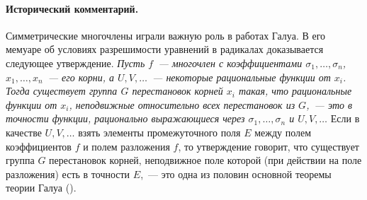 \paragraph{Исторический комментарий.} Симметрические многочлены играли важную роль в работах Галуа. В его
мемуаре об условиях разрешимости уравнений в радикалах доказывается следующее утверждение. \emph{Пусть $f$~---
многочлен с коэффициентами $\sigma_1,\dots,\sigma_n$, $x_1,\dots,x_n$~--- его корни, а $U,V,\dots$~--- некоторые
рациональные функции от $x_i$. Тогда существует группа $G$ перестановок корней $x_i$ такая, что рациональные функции
от $x_i$, неподвижные относительно всех перестановок из $G$,~--- это в точности функции, рационально выражающиеся через
$\sigma_1,\dots,\sigma_n$ и $U,V,\dots$} Если в качестве $U,V,\dots$ взять элементы промежуточного поля $E$ между полем
коэффициентов $f$ и полем разложения $f$, то утверждение говорит, что существует группа $G$ перестановок корней, неподвижное
поле которой (при действии на поле разложения) есть в точности $E$,~--- это одна из половин основной теоремы теории
Галуа ().
